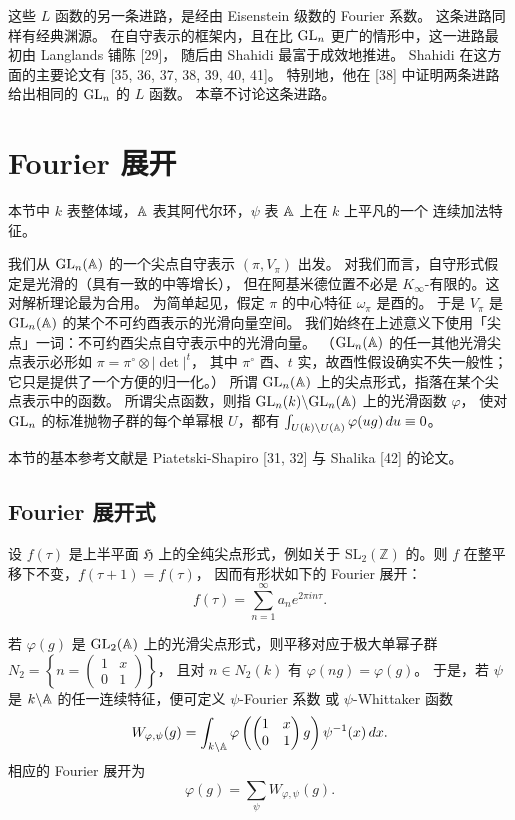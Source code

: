 这些 $L$ 函数的另一条进路，是经由 Eisenstein 级数的 Fourier 系数。
这条进路同样有经典渊源。
在自守表示的框架内，且在比 $\mathrm{GL}_n$ 更广的情形中，这一进路最初由 Langlands 铺陈 [29]，
随后由 Shahidi 最富于成效地推进。
Shahidi 在这方面的主要论文有 [35, 36, 37, 38, 39, 40, 41]。
特别地，他在 [38] 中证明两条进路给出相同的 $\mathrm{GL}_n$ 的 $L$ 函数。
本章不讨论这条进路。

\section{Fourier 展开}

本节中 $k$ 表整体域，$\mathbb{A}$ 表其阿代尔环，$\psi$ 表 $\mathbb{A}$ 上在 $k$ 上平凡的一个
连续加法特征。

我们从 $\mathrm{GL}_n(\mathbb{A})$ 的一个尖点自守表示 $(\pi,V_\pi)$ 出发。
对我们而言，自守形式假定是光滑的（具有一致的中等增长），
但在阿基米德位置不必是 $K_\infty$-有限的。这对解析理论最为合用。
为简单起见，假定 $\pi$ 的中心特征 $\omega_\pi$ 是酉的。
于是 $V_\pi$ 是 $\mathrm{GL}_n(\mathbb{A})$ 的某个不可约酉表示的光滑向量空间。
我们始终在上述意义下使用「尖点」一词：不可约酉尖点自守表示中的光滑向量。
（$\mathrm{GL}_n(\mathbb{A})$ 的任一其他光滑尖点表示必形如 $\pi=\pi^\circ\otimes|\det|^t$，
其中 $\pi^\circ$ 酉、$t$ 实，故酉性假设确实不失一般性；它只是提供了一个方便的归一化。）
所谓 $\mathrm{GL}_n(\mathbb{A})$ 上的尖点形式，指落在某个尖点表示中的函数。
所谓尖点函数，则指 $\mathrm{GL}_n(k)\backslash\mathrm{GL}_n(\mathbb{A})$ 上的光滑函数 $\varphi$，
使对 $\mathrm{GL}_n$ 的标准抛物子群的每个单幂根 $U$，都有
$\int_{U(k)\backslash U(\mathbb{A})}\varphi(ug)\,du\equiv0$。

本节的基本参考文献是 Piatetski-Shapiro [31, 32] 与 Shalika [42] 的论文。

\subsection{Fourier 展开式}

设 $f(\tau)$ 是上半平面 $\mathfrak{H}$ 上的全纯尖点形式，例如关于
$\mathrm{SL}_2(\mathbb{Z})$ 的。则 $f$ 在整平移下不变，$f(\tau+1)=f(\tau)$，
因而有形状如下的 Fourier 展开：
\[
f(\tau)=\sum_{n=1}^{\infty}a_ne^{2\pi in\tau}.
\]

若 $\varphi(g)$ 是 $\mathrm{GL}_2(\mathbb{A})$ 上的光滑尖点形式，则平移对应于极大单幂子群
$N_2=\left\{n=\begin{pmatrix}1&x\\0&1\end{pmatrix}\right\}$，
且对 $n\in N_2(k)$ 有 $\varphi(ng)=\varphi(g)$。
于是，若 $\psi$ 是 $k\backslash\mathbb{A}$ 的任一连续特征，便可定义 $\psi$-Fourier 系数
或 $\psi$-Whittaker 函数
\[
W_{\varphi,\psi}(g)=\int_{k\backslash\mathbb{A}}\varphi\left(\begin{pmatrix}1&x\\0&1\end{pmatrix}g\right)\psi^{-1}(x)\,dx.
\]
相应的 Fourier 展开为
\[
\varphi(g)=\sum_{\psi}W_{\varphi,\psi}(g).
\]


